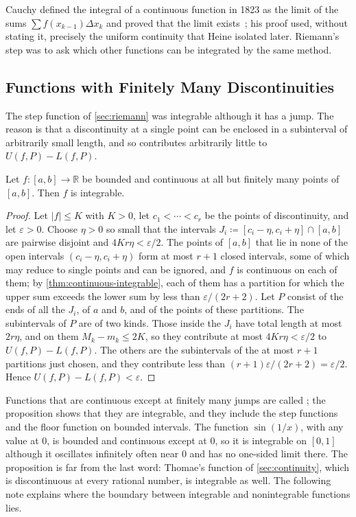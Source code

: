 Cauchy defined the integral of a continuous function in 1823 as the limit of the sums $\sum f(x_{k-1})\Delta x_k$ and proved that the limit exists~\cite{cauchy1823,grabiner1981}; his proof used, without stating it, precisely the uniform continuity that Heine isolated later. Riemann's step was to ask which other functions can be integrated by the same method.

\subsection{Functions with Finitely Many Discontinuities}

The step function of \cref{sec:riemann} was integrable although it has a jump. The reason is that a discontinuity at a single point can be enclosed in a subinterval of arbitrarily small length, and so contributes arbitrarily little to $U(f,P)-L(f,P)$.

\begin{proposition}
\label{prop:piecewise-integrable}
Let $f\colon[a,b]\to\mathbb R$ be bounded and continuous at all but finitely many points of $[a,b]$. Then $f$ is integrable.
\end{proposition}

\begin{proof}
Let $|f|\le K$ with $K>0$, let $c_1<\cdots<c_r$ be the points of discontinuity, and let $\varepsilon>0$. Choose $\eta>0$ so small that the intervals $J_i\coloneqq[c_i-\eta,c_i+\eta]\cap[a,b]$ are pairwise disjoint and $4Kr\eta<\varepsilon/2$. The points of $[a,b]$ that lie in none of the open intervals $(c_i-\eta,c_i+\eta)$ form at most $r+1$ closed intervals, some of which may reduce to single points and can be ignored, and $f$ is continuous on each of them; by \cref{thm:continuous-integrable}, each of them has a partition for which the upper sum exceeds the lower sum by less than $\varepsilon/(2r+2)$. Let $P$ consist of the ends of all the $J_i$, of $a$ and $b$, and of the points of these partitions. The subintervals of $P$ are of two kinds. Those inside the $J_i$ have total length at most $2r\eta$, and on them $M_k-m_k\le2K$, so they contribute at most $4Kr\eta<\varepsilon/2$ to $U(f,P)-L(f,P)$. The others are the subintervals of the at most $r+1$ partitions just chosen, and they contribute less than $(r+1)\varepsilon/(2r+2)=\varepsilon/2$. Hence $U(f,P)-L(f,P)<\varepsilon$.
\end{proof}

Functions that are continuous except at finitely many jumps are called ; the proposition shows that they are integrable, and they include the step functions and the floor function on bounded intervals. The function $\sin(1/x)$, with any value at $0$, is bounded and continuous except at $0$, so it is integrable on $[0,1]$ although it oscillates infinitely often near $0$ and has no one-sided limit there. The proposition is far from the last word: Thomae's function of \cref{sec:continuity}, which is discontinuous at every rational number, is integrable as well. The following note explains where the boundary between integrable and nonintegrable functions lies.

